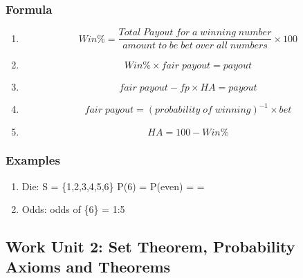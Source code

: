 \documentclass[a4paper,10pt]{article}
\begin{document}
\subsubsection{Formula}
\begin{enumerate}
\item \[ Win\% = \frac{Total \;Payout\; for\; a\; winning\; number}{amount\; to\; be\; bet\; over\; all\; numbers} \times 100\]
\item \[ Win \% \times fair \; payout = payout\]
\item \[ fair \; payout -fp\times HA = payout  \]
\item \[ fair\; payout = (probability \; of \; winning)^{-1} \times bet \]
\item \[ HA = 100 - Win\% \]
\end{enumerate}

\subsubsection{Examples}
\begin{enumerate}
	\item Die: S = \{1,2,3,4,5,6\}   P(6) =    P(even) =  = 
	\item Odds: odds of \{6\} = 1:5
\end{enumerate}

\subsection{Work Unit 2: Set Theorem, Probability Axioms and Theorems}
\end{document}
